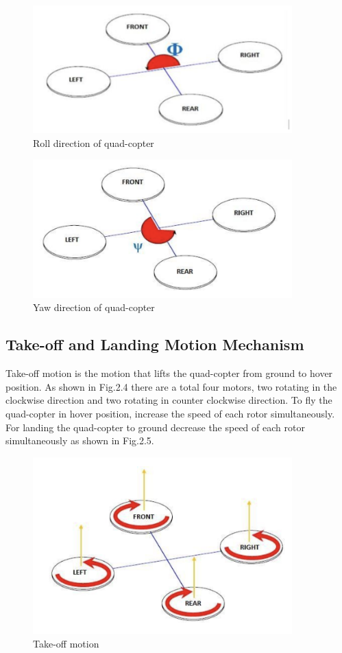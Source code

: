 \begin{figure}[h!]
\centering
\includegraphics[width=10cm]{./Figures/roll_direction.png}
\caption{Roll direction of quad-copter}
\label{Roll_direction_of_quadcopter}
\end{figure}

\begin{figure}[h!]
\centering
\includegraphics[width=10cm]{./Figures/yaw_dir_qc.png}
\caption{Yaw direction of quad-copter}
\label{Yaw_direction_of_quadcopter}
\end{figure}

\subsection{Take-off and Landing Motion Mechanism}
\par Take-off motion is the motion that lifts the quad-copter from ground to hover position. As shown in Fig.2.4 there are a total four motors, two rotating in the clockwise direction and two rotating in counter clockwise direction. To fly the quad-copter in hover position, increase the speed of each rotor simultaneously. For landing the quad-copter to ground decrease the speed of each rotor simultaneously as shown in Fig.2.5.

\begin{figure}[h!]
\centering
\includegraphics[width=10cm]{./Figures/takeoff_qc.png}
\caption{Take-off motion}
\label{Take_off_motion}
\end{figure}

